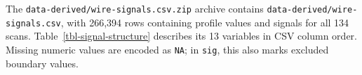 \documentclass[11pt,a4paper]{article}
\begin{document}
\begin{table}[hbt]

\caption{\label{tbl-profile-structure}Structure of the
\texttt{profiles-*.csv} files.}


\end{table}%

The \texttt{data-derived/wire-signals.csv.zip} archive contains
\texttt{data-derived/wire-signals.csv}, with 266,394 rows containing
profile values and signals for all 134 scans.
Table~\ref{tbl-signal-structure} describes its 13 variables in CSV
column order. Missing numeric values are encoded as \texttt{NA}; in
\texttt{sig}, this also marks excluded boundary values.
\end{document}
